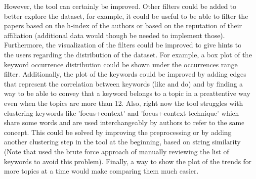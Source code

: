 \documentclass[11pt]{article}
\begin{document}
However, the tool can certainly be improved. Other filters could be added to better explore the dataset, for example, it could be useful to be able to filter the papers based on the h-index of the authors or based on the reputation of their affiliation (additional data would though be needed to implement those). Furthermore, the visualization of the filters could be improved to give hints to the users regarding the distribution of the dataset. For example, a box plot of the keyword occurrence distribution could be shown under the occurrences range filter. Additionally, the plot of the keywords could be improved by adding edges that represent the correlation between keywords (like \cite{Hu2013ACA} and \cite{7539364} do) and by finding a way to be able to convey that a keyword belongs to a topic in a preattentive way even when the topics are more than 12. Also, right now the tool struggles with clustering keywords like 'focus+context' and 'focus+context technique' which share some words and are used interchangeably by authors to refer to the same concept. This could be solved by improving the preprocessing or by adding another clustering step in the tool at the beginning, based on string similarity (Note that \cite{7539364} used the brute force approach of manually reviewing the list of keywords to avoid this problem). Finally, a way to show the plot of the trends for more topics at a time would make comparing them much easier.

\newpage


 
\end{document}
